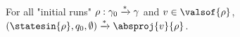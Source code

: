 
\begin{lemma}
	\label{lem:proof_completeness_covset_constant}
	For all "initial runs" $\rho: \gamma_0 \xrightarrow{*} \gamma$ and $\aval \in \valsof{\run}$, $(\statesin{\run}, q_0, \emptyset) \step{*} \absproj{\aval}{\run}$. 
\end{lemma}


